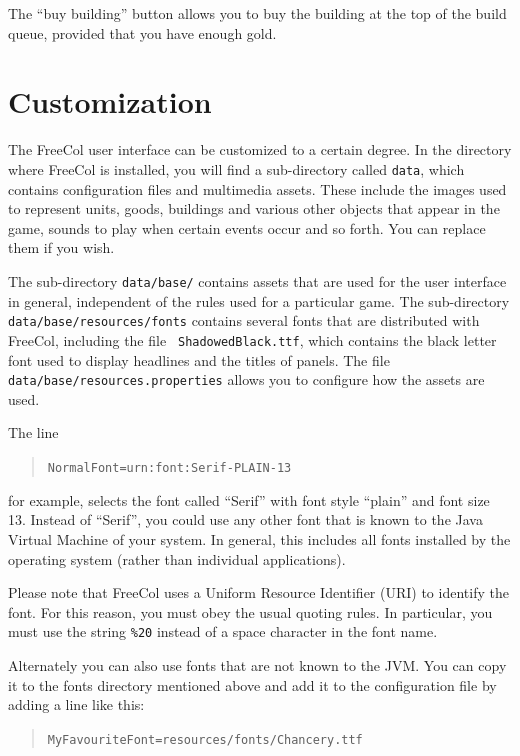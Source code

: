 \documentclass[12pt]{book}
\begin{document}
The ``buy building'' button allows you to buy the building at the top
of the build queue, provided that you have enough gold.


\hypertarget{customization}{\section{Customization}}

The FreeCol user interface can be customized to a certain degree. In
the directory where FreeCol is installed, you will find a
sub-directory called {\tt data}, which contains configuration files
and multimedia assets. These include the images used to represent
units, goods, buildings and various other objects that appear in the
game, sounds to play when certain events occur and so forth. You can
replace them if you wish.

The sub-directory {\tt data/base/} contains assets that are used for
the user interface in general, independent of the rules used for a
particular game. The sub-directory {\tt
  data/\-base/\-resources/\-fonts} contains several fonts
that are distributed with FreeCol, including the file {\tt
  ShadowedBlack.ttf}, which contains the black letter font used to
display headlines and the titles of panels. The file {\tt
  data/\-base/\-resources.properties} allows you to configure how the
assets are used.

The line

\begin{quote}
{\tt NormalFont=urn:font:Serif-PLAIN-13}
\end{quote}

for example, selects the font called ``Serif'' with font style
``plain'' and font size 13. Instead of ``Serif'', you could use any
other font that is known to the Java Virtual Machine of your
system. In general, this includes all fonts installed by the operating
system (rather than individual applications).

Please note that FreeCol uses a Uniform Resource Identifier (URI) to
identify the font. For this reason, you must obey the usual quoting
rules. In particular, you must use the string {\tt \%20} instead of a
space character in the font name.

Alternately you can also use fonts that are not known to the JVM. You
can copy it to the fonts directory mentioned above and add it to the
configuration file by adding a line like this:

\begin{quote}
{\tt MyFavouriteFont=resources/fonts/Chancery.ttf}
\end{quote}
\end{document}
